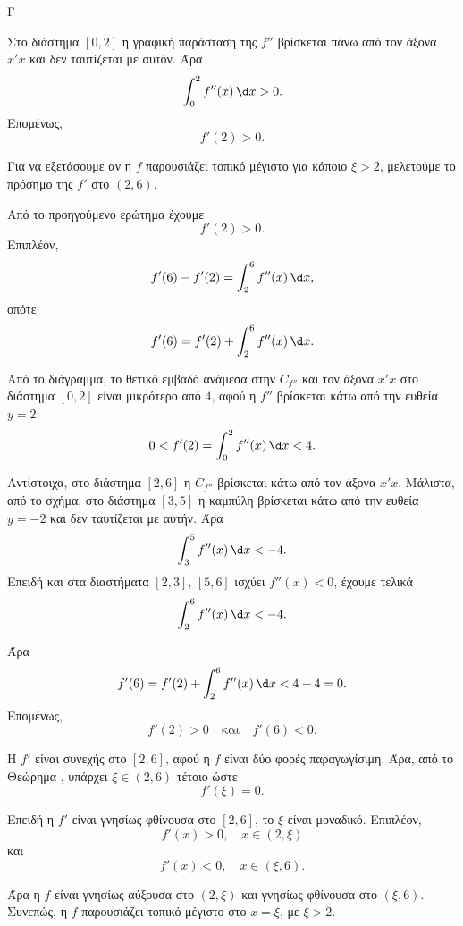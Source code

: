 \begin{thema}{Γ}
\begin{erwthma}
Στο διάστημα $[0,2]$ η γραφική παράσταση της $f''$ βρίσκεται πάνω από τον άξονα $x'x$ και δεν ταυτίζεται με αυτόν. Άρα
\[
\int_0^2 f''(x)\,\d x>0.
\]
Επομένως,
\[
f'(2)>0.
\]

\item Για να εξετάσουμε αν η $f$ παρουσιάζει τοπικό μέγιστο για κάποιο $\xi>2$, μελετούμε το πρόσημο της $f'$ στο $(2,6)$.

Από το προηγούμενο ερώτημα έχουμε
\[
f'(2)>0.
\]
Επιπλέον,
\[
f'(6)-f'(2)=\int_2^6 f''(x)\,\d x,
\]
οπότε
\[
f'(6)=f'(2)+\int_2^6 f''(x)\,\d x.
\]

Από το διάγραμμα, το θετικό εμβαδό ανάμεσα στην $C_{f''}$ και τον άξονα $x'x$ στο διάστημα $[0,2]$ είναι μικρότερο από $4$, αφού η $f''$ βρίσκεται κάτω από την ευθεία $y=2$:
\[
0<f'(2)=\int_0^2 f''(x)\,\d x<4.
\]

Αντίστοιχα, στο διάστημα $[2,6]$ η $C_{f''}$ βρίσκεται κάτω από τον άξονα $x'x$. Μάλιστα, από το σχήμα, στο διάστημα $[3,5]$ η καμπύλη βρίσκεται κάτω από την ευθεία $y=-2$ και δεν ταυτίζεται με αυτήν. Άρα
\[
\int_3^5 f''(x)\,\d x<-4.
\]
Επειδή και στα διαστήματα $[2,3]$, $[5,6]$ ισχύει $f''(x)<0$, έχουμε τελικά
\[
\int_2^6 f''(x)\,\d x<-4.
\]

Άρα
\[
f'(6)=f'(2)+\int_2^6 f''(x)\,\d x<4-4=0.
\]
Επομένως,
\[
f'(2)>0
\quad\text{και}\quad
f'(6)<0.
\]

Η $f'$ είναι συνεχής στο $[2,6]$, αφού η $f$ είναι δύο φορές παραγωγίσιμη. Άρα, από το Θεώρημα , υπάρχει $\xi\in(2,6)$ τέτοιο ώστε
\[
f'(\xi)=0.
\]

Επειδή η $f'$ είναι γνησίως φθίνουσα στο $[2,6]$, το $\xi$ είναι μοναδικό. Επιπλέον,
\[
f'(x)>0,\quad x\in(2,\xi)
\]
και
\[
f'(x)<0,\quad x\in(\xi,6).
\]

Άρα η $f$ είναι γνησίως αύξουσα στο $(2,\xi)$ και γνησίως φθίνουσα στο $(\xi,6)$. Συνεπώς, η $f$ παρουσιάζει τοπικό μέγιστο στο $x=\xi$, με $\xi>2$.
\end{erwthma}
\end{thema}



